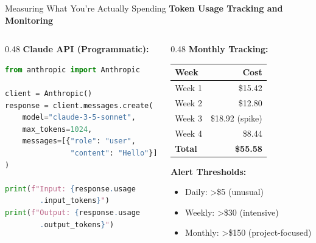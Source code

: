 \documentclass[aspectratio=169,11pt]{beamer}
\begin{document}
\begin{frame}[fragile]{Measuring What You're Actually Spending}
    \textbf{Token Usage Tracking and Monitoring}

    \begin{columns}[T]
        \begin{column}{0.48\textwidth}
            \textbf{Claude API (Programmatic):}
            \begin{lstlisting}[language=Python]
from anthropic import Anthropic

client = Anthropic()
response = client.messages.create(
    model="claude-3-5-sonnet",
    max_tokens=1024,
    messages=[{"role": "user",
               "content": "Hello"}]
)

print(f"Input: {response.usage
        .input_tokens}")
print(f"Output: {response.usage
        .output_tokens}")
            \end{lstlisting}
        \end{column}
        \begin{column}{0.48\textwidth}
            \textbf{Monthly Tracking:}

            \begin{tabular}{lr}
                \toprule
                Week & Cost\\
                \midrule
                Week 1 & \$15.42\\
                Week 2 & \$12.80\\
                Week 3 & \$18.92 (spike)\\
                Week 4 & \$8.44\\
                \midrule
                \textbf{Total} & \textbf{\$55.58}\\
                \bottomrule
            \end{tabular}

            \vspace{0.3cm}
            \textbf{Alert Thresholds:}
            \begin{itemize}
                \item Daily: >\$5 (unusual)
                \item Weekly: >\$30 (intensive)
                \item Monthly: >\$150 (project-focused)
            \end{itemize}
        \end{column}
    \end{columns}
\end{frame}
\end{document}
